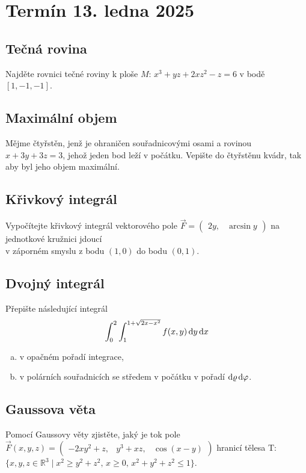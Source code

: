 \section{Termín 13. ledna 2025}

\subsection{Tečná rovina}
Najděte rovnici tečné roviny k ploše $M$: $x^3 + yz + 2xz^2 - z = 6$ v bodě $[1, -1, -1]$.

\subsection{Maximální objem}
Mějme čtyřstěn, jenž je ohraničen souřadnicovými osami a rovinou $x+3y+3z=3$, jehož jeden bod leží v počátku. Vepište do
čtyřstěnu kvádr, tak aby byl jeho objem maximální.

\subsection{Křivkový integrál}
Vypočítejte křivkový integrál vektorového pole 
$\vec{F} =
\begin{pmatrix}
    2y, & \arcsin y
\end{pmatrix}$ na jednotkové kružnici jdoucí \\
v záporném smyslu z bodu $(1, 0)$ do bodu $(0,1)$.

\subsection{Dvojný integrál}
Přepište následující integrál
\[
    \int_{0}^{2} \int_{1}^{1+\sqrt{2x-x^2}} f(x,y) \mathop{}\!\mathrm{d} y \mathop{}\!\mathrm{d} x
\]
\begin{enumerate}[a), noitemsep]
    \item v opačném pořadí integrace,
    \item v polárních souřadnicích se středem v počátku v pořadí $\mathop{}\!\mathrm{d} \varrho \mathop{}\!\mathrm{d} \varphi$.
\end{enumerate}

\subsection{Gaussova věta}
Pomocí Gaussovy věty zjistěte, jaký je tok pole 
$\vec{F}(x, y, z) =
\begin{pmatrix}
    -2xy^2 + z, & y^3+xz, &\cos(x-y)
\end{pmatrix}$ 
hranicí tělesa T: $\{x,y,z \in \mathbb{R}^3 \mid x^2 \geq y^2 + z^2 \text{, } x \geq 0 \text{, } x^2 + y^2 + z^2 \leq 1\}$.


